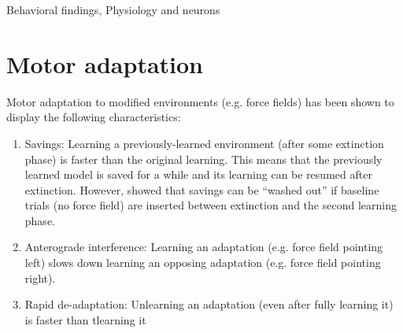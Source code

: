 \documentclass{report}
\begin{document}
\begin{chapter}{Behavioral findings, Physiology and neurons}
\section{Motor adaptation}
Motor adaptation to modified environments (e.g. force fields) has been shown to display the following characteristics:
\begin{enumerate}
\item Savings: Learning a previously-learned environment (after some extinction phase) is faster than the original learning. This means that the previously learned model is saved for a while and its learning can be resumed after extinction. However, \cite{Kojima_Memory_2004} showed that savings can be ``washed out'' if baseline trials (no force field) are inserted between extinction and the second learning phase.
\item Anterograde interference: Learning an adaptation (e.g. force field pointing left) slows down learning an opposing adaptation (e.g. force field pointing right).
\item Rapid de-adaptation: Unlearning an adaptation (even after fully learning it) is faster than tlearning it \citep{Davidson_Scaling_2004}
\end{enumerate}

\end{chapter}

\end{document}
